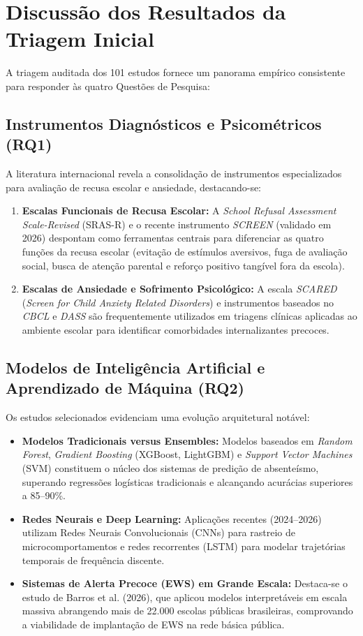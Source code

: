 \documentclass[journal,10pt,a4paper]{IEEEtran}
\begin{document}
\section{Discussão dos Resultados da Triagem Inicial}

A triagem auditada dos 101 estudos fornece um panorama empírico consistente para responder às quatro Questões de Pesquisa:

\subsection{Instrumentos Diagnósticos e Psicométricos (RQ1)}
A literatura internacional revela a consolidação de instrumentos especializados para avaliação de recusa escolar e ansiedade, destacando-se:
\begin{enumerate}
    \item \textbf{Escalas Funcionais de Recusa Escolar:} A \textit{School Refusal Assessment Scale-Revised} (SRAS-R) e o recente instrumento \textit{SCREEN} (validado em 2026) despontam como ferramentas centrais para diferenciar as quatro funções da recusa escolar (evitação de estímulos aversivos, fuga de avaliação social, busca de atenção parental e reforço positivo tangível fora da escola).
    \item \textbf{Escalas de Ansiedade e Sofrimento Psicológico:} A escala \textit{SCARED} (\textit{Screen for Child Anxiety Related Disorders}) e instrumentos baseados no \textit{CBCL} e \textit{DASS} são frequentemente utilizados em triagens clínicas aplicadas ao ambiente escolar para identificar comorbidades internalizantes precoces.
\end{enumerate}

\subsection{Modelos de Inteligência Artificial e Aprendizado de Máquina (RQ2)}
Os estudos selecionados evidenciam uma evolução arquitetural notável:
\begin{itemize}
    \item \textbf{Modelos Tradicionais versus Ensembles:} Modelos baseados em \textit{Random Forest}, \textit{Gradient Boosting} (XGBoost, LightGBM) e \textit{Support Vector Machines} (SVM) constituem o núcleo dos sistemas de predição de absenteísmo, superando regressões logísticas tradicionais e alcançando acurácias superiores a 85--90\%.
    \item \textbf{Redes Neurais e Deep Learning:} Aplicações recentes (2024--2026) utilizam Redes Neurais Convolucionais (CNNs) para rastreio de microcomportamentos e redes recorrentes (LSTM) para modelar trajetórias temporais de frequência discente.
    \item \textbf{Sistemas de Alerta Precoce (EWS) em Grande Escala:} Destaca-se o estudo de Barros et al. (2026), que aplicou modelos interpretáveis em escala massiva abrangendo mais de 22.000 escolas públicas brasileiras, comprovando a viabilidade de implantação de EWS na rede básica pública.
\end{itemize}
\end{document}
